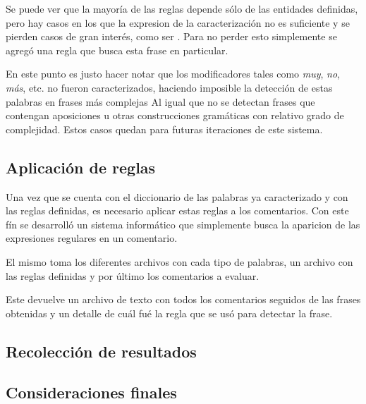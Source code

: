 Se puede ver que la mayoría de las reglas depende sólo de las entidades definidas, pero hay casos en los que la expresion de la caracterización no es suficiente y se pierden casos de gran interés, como ser . Para no perder esto simplemente se agregó una regla que busca esta frase en particular.

En este punto es justo hacer notar que los modificadores tales como \emph{muy}, \emph{no}, \emph{más}, etc. no fueron caracterizados, haciendo imposible la detección de estas palabras en frases más complejas  Al igual que no se detectan frases que contengan aposiciones u otras construcciones gramáticas con relativo grado de complejidad. Estos casos quedan para futuras iteraciones de este sistema.

\subsection{Aplicación de reglas}

Una vez que se cuenta con el diccionario de las palabras ya caracterizado y con las reglas definidas, es necesario aplicar estas reglas a los comentarios. Con este fín se desarrolló un sistema informático que simplemente busca la aparicion de las expresiones regulares en un comentario.

El mismo toma los diferentes archivos con cada tipo de palabras, un archivo con las reglas definidas y por último los comentarios a evaluar.

Este devuelve un archivo de texto con todos los comentarios seguidos de las frases obtenidas y un detalle de cuál fué la regla que se usó para detectar la frase.

\subsection{Recolección de resultados}


\subsection{Consideraciones finales}
